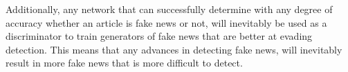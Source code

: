 \documentclass{article}
\begin{document}
	Additionally, any network that can successfully determine with any degree of accuracy whether an article is fake news or not, will inevitably be used as a discriminator to train generators of fake news that are better at evading detection. This means that any advances in detecting fake news, will inevitably result in more fake news that is more difficult to detect.
\end{document}
